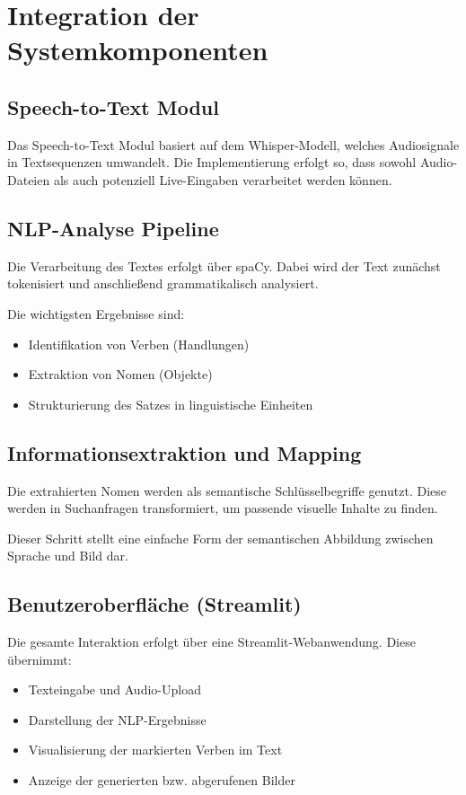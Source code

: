 \section{Integration der Systemkomponenten}

\subsection{Speech-to-Text Modul}
Das Speech-to-Text Modul basiert auf dem Whisper-Modell, welches Audiosignale in Textsequenzen umwandelt. Die Implementierung erfolgt so, dass sowohl Audio-Dateien als auch potenziell Live-Eingaben verarbeitet werden können.

\subsection{NLP-Analyse Pipeline}
Die Verarbeitung des Textes erfolgt über spaCy. Dabei wird der Text zunächst tokenisiert und anschließend grammatikalisch analysiert.

Die wichtigsten Ergebnisse sind:
\begin{itemize}
    \item Identifikation von Verben (Handlungen)
    \item Extraktion von Nomen (Objekte)
    \item Strukturierung des Satzes in linguistische Einheiten
\end{itemize}

\subsection{Informationsextraktion und Mapping}
Die extrahierten Nomen werden als semantische Schlüsselbegriffe genutzt. Diese werden in Suchanfragen transformiert, um passende visuelle Inhalte zu finden.

Dieser Schritt stellt eine einfache Form der semantischen Abbildung zwischen Sprache und Bild dar.

\subsection{Benutzeroberfläche (Streamlit)}
Die gesamte Interaktion erfolgt über eine Streamlit-Webanwendung. Diese übernimmt:

\begin{itemize}
    \item Texteingabe und Audio-Upload
    \item Darstellung der NLP-Ergebnisse
    \item Visualisierung der markierten Verben im Text
    \item Anzeige der generierten bzw. abgerufenen Bilder
\end{itemize}

